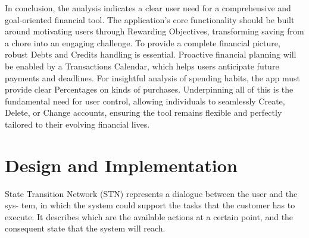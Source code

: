 \documentclass[a4paper,12pt]{article}
\begin{document}
In conclusion, the analysis indicates a clear user need for a comprehensive and goal-oriented financial tool. The application's core functionality should be built around motivating users through Rewarding Objectives, transforming saving from a chore into an engaging challenge. To provide a complete financial picture, robust Debts and Credits handling is essential. Proactive financial planning will be enabled by a Transactions Calendar, which helps users anticipate future payments and deadlines. For insightful analysis of spending habits, the app must provide clear Percentages on kinds of purchases. Underpinning all of this is the fundamental need for user control, allowing individuals to seamlessly Create, Delete, or Change accounts, ensuring the tool remains flexible and perfectly tailored to their evolving financial lives.
\vspace{5cm}
\section{Design and Implementation}
State Transition Network (STN) represents a dialogue between the user and the sys-
tem, in which the system could support the tasks that the customer has to execute. It describes
which are the available actions at a certain point, and the consequent state that the system will reach.
\end{document}
